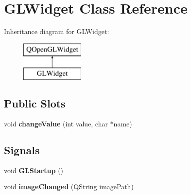 \hypertarget{class_g_l_widget}{}\section{G\+L\+Widget Class Reference}
\label{class_g_l_widget}
Inheritance diagram for G\+L\+Widget\+:\begin{figure}[H]
\begin{center}
\leavevmode
\includegraphics[height=2.000000cm]{class_g_l_widget}
\end{center}
\end{figure}
\subsection*{Public Slots}
\begin{DoxyCompactItemize}
\item 
void {\bfseries change\+Value} (int value, char $\ast$name)\hypertarget{class_g_l_widget_a7c72bab4c6a9662487718c741e6bd22d}{}\label{class_g_l_widget_a7c72bab4c6a9662487718c741e6bd22d}

\end{DoxyCompactItemize}
\subsection*{Signals}
\begin{DoxyCompactItemize}
\item 
void {\bfseries G\+L\+Startup} ()\hypertarget{class_g_l_widget_a2f91231c336a0eeb36df927f2d2840a2}{}\label{class_g_l_widget_a2f91231c336a0eeb36df927f2d2840a2}

\item 
void {\bfseries image\+Changed} (Q\+String image\+Path)\hypertarget{class_g_l_widget_a5187e72bdf07719b60bc37670bcaab04}{}\label{class_g_l_widget_a5187e72bdf07719b60bc37670bcaab04}

\end{DoxyCompactItemize}
